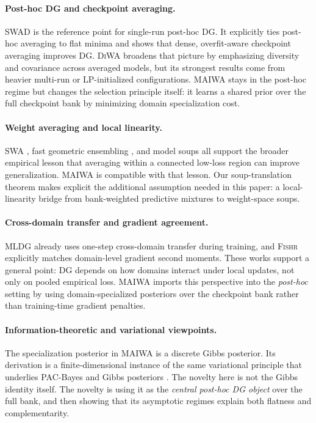 \documentclass{article}
\newcommand{\maiwa}{\textup{\textsc{MAIWA}}}
\newcommand{\swad}{\textup{\textsc{SWAD}}}
\newcommand{\diwa}{\textup{\textsc{DiWA}}}
\newcommand{\mldg}{\textup{\textsc{MLDG}}}
\newcommand{\fishr}{\textup{\textsc{Fishr}}}
\begin{document}
\paragraph{Post-hoc DG and checkpoint averaging.}
\swad{} \citep{cha2021swad} is the reference point for single-run post-hoc DG. It explicitly ties post-hoc averaging to flat minima and shows that dense, overfit-aware checkpoint averaging improves DG. \diwa{} \citep{rame2022diwa} broadens that picture by emphasizing diversity and covariance across averaged models, but its strongest results come from heavier multi-run or LP-initialized configurations. \maiwa{} stays in the post-hoc regime but changes the selection principle itself: it learns a shared prior over the full checkpoint bank by minimizing domain specialization cost.

\paragraph{Weight averaging and local linearity.}
SWA \citep{izmailov2018swa}, fast geometric ensembling \citep{garipov2018fge}, and model soups \citep{wortsman2022soups} all support the broader empirical lesson that averaging within a connected low-loss region can improve generalization. \maiwa{} is compatible with that lesson. Our soup-translation theorem makes explicit the additional assumption needed in this paper: a local-linearity bridge from bank-weighted predictive mixtures to weight-space soups.

\paragraph{Cross-domain transfer and gradient agreement.}
\mldg{} \citep{li2018mldg} already uses one-step cross-domain transfer during training, and \fishr{} \citep{rame2022fishr} explicitly matches domain-level gradient second moments. These works support a general point: DG depends on how domains interact under local updates, not only on pooled empirical loss. \maiwa{} imports this perspective into the \emph{post-hoc} setting by using domain-specialized posteriors over the checkpoint bank rather than training-time gradient penalties.

\paragraph{Information-theoretic and variational viewpoints.}
The specialization posterior in \maiwa{} is a discrete Gibbs posterior. Its derivation is a finite-dimensional instance of the same variational principle that underlies PAC-Bayes and Gibbs posteriors \citep{catoni2007pac,donsker1975asymptotic}. The novelty here is not the Gibbs identity itself. The novelty is using it as the \emph{central post-hoc DG object} over the full bank, and then showing that its asymptotic regimes explain both flatness and complementarity.
\end{document}
